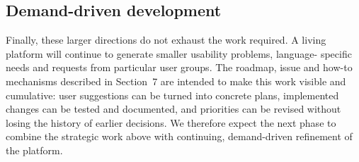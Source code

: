 \subsection{Demand-driven development}

Finally, these larger directions do not exhaust the work required. A living
platform will continue to generate smaller usability problems, language-
specific needs and requests from particular user groups. The roadmap, issue
and how-to mechanisms described in Section~7 are intended to make this work
visible and cumulative: user suggestions can be turned into concrete plans,
implemented changes can be tested and documented, and priorities can be
revised without losing the history of earlier decisions. We therefore expect
the next phase to combine the strategic work above with continuing,
demand-driven refinement of the platform.
